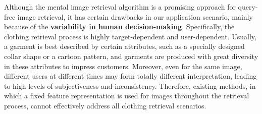 \documentclass[journal]{IEEEtran}
\begin{document}
Although the mental image retrieval algorithm is a promising approach for query-free image retrieval, it has certain drawbacks in our application scenario, mainly because of the \textbf{variability in human decision-making}. Specifically, the clothing retrieval process is highly target-dependent and user-dependent. Usually, a garment is best described by certain attributes, such as a specially designed collar shape or a cartoon pattern, and garments are produced with great diversity in these attributes to impress customers. Moreover, even for the same image, different users at different times may form totally different interpretation, leading to high levels of subjectiveness and inconsistency. Therefore, existing methods, in which a fixed feature representation is used for images throughout the retrieval process, cannot effectively address all clothing retrieval scenarios.


\end{document}
